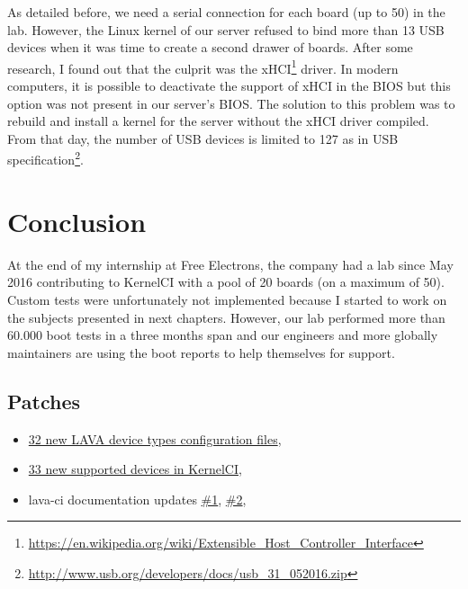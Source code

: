 As detailed before, we need a serial connection for each board (up to 50) in the lab. However, the Linux kernel of our server refused to bind more than 13 USB devices when it was time to create a second drawer of boards. After some research, I found out that the culprit was the xHCI\footnote{\url{https://en.wikipedia.org/wiki/Extensible\_Host\_Controller\_Interface}} driver. In modern computers, it is possible to deactivate the support of xHCI in the BIOS but this option was not present in our server's BIOS. The solution to this problem was to rebuild and install a kernel for the server without the xHCI driver compiled. From that day, the number of USB devices is limited to 127 as in USB specification\footnote{\url{http://www.usb.org/developers/docs/usb\_31\_052016.zip}}.

\section{Conclusion}
At the end of my internship at Free Electrons, the company had a lab since May 2016 contributing to KernelCI with a pool of 20 boards (on a maximum of 50). Custom tests were unfortunately not implemented because I started to work on the subjects presented in next chapters. However, our lab performed more than 60.000 boot tests in a three months span and our engineers and more globally maintainers are using the boot reports to help themselves for support.

\subsection{Patches}

\begin{itemize}
  \item \href{https://review.linaro.org/#/q/Quentin\%20Schulz}{32 new LAVA device types configuration files},
  \item \href{https://github.com/kernelci/lava-ci/commits/master?author=quentin.schulz\%40free-electrons.com&page=1}{33 new supported devices in KernelCI},
  \item lava-ci documentation updates \href{https://github.com/kernelci/lava-ci/commit/058e9a72a752c9851c16a96aa51beafc9ce80128}{\#1}, \href{https://github.com/kernelci/lava-ci/pull/56}{\#2},
\end{itemize}
